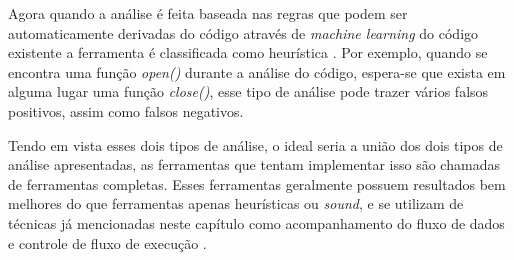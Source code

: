 Agora quando a análise é feita baseada nas regras que podem ser automaticamente
derivadas do código através de \textit{machine learning} do código existente a
ferramenta é classificada como heurística \cite{paul:2001}. Por exemplo, quando
se encontra uma função \textit{open()} durante a análise do código, espera-se
que exista em alguma lugar uma função \textit{close()}, esse tipo de análise
pode trazer vários falsos positivos, assim como falsos negativos.

Tendo em vista esses dois tipos de análise, o ideal seria a união dos dois tipos
de análise apresentadas, as ferramentas que tentam implementar isso são chamadas
de ferramentas completas. Esses ferramentas geralmente possuem resultados bem
melhores do que ferramentas apenas heurísticas ou \textit{sound}, e se utilizam
de técnicas já mencionadas neste capítulo como acompanhamento do fluxo de dados
e controle de fluxo de execução \cite{paul:2001}.

